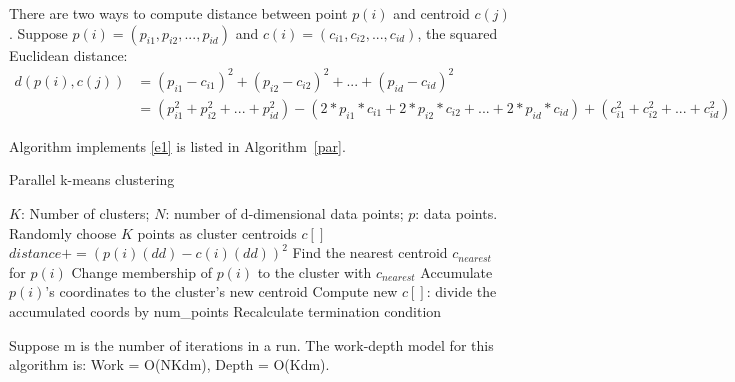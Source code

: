 \documentclass{article}
\begin{document}
There are two ways to compute distance between point $p(i)$
and centroid $c(j)$. Suppose $p(i) = (p_{i1}, p_{i2}, ..., p_{id})$ and $c(i) = (c_{i1},
c_{i2}, ..., c_{id})$, the squared Euclidean distance: 
\begin{align}
d(p(i),c(j)) &= (p_{i1} - c_{i1})^2 + (p_{i2} - c_{i2})^2 + ... + (p_{id} - c_{id})^2 \label{e1}\\
&= (p_{i1}^2 + p_{i2}^2 + ... + p_{id}^2) - (2*p_{i1}*c_{i1} + 2*p_{i2}*c_{i2} + ... + 2*p_{id}*c_{id})
+ (c_{i1}^2 + c_{i2}^2 + ... + c_{id}^2) \label{e2}
\end{align}

Algorithm implements \ref{e1} is listed in Algorithm~\ref{par}. 
\begin{algorithm}[!htp]
  \caption{Parallel k-means clustering} \label{par}
  \begin{algorithmic}[1]
    \INPUT $K$: Number of clusters; $N$: number of d-dimensional data points; $p$: data points.
     \label{alg:p}
    \State Randomly choose $K$ points as cluster centroids $c[]$
    \State $distance += (p(i)(dd) - c(i)(dd))^2$
    \EndFor
    \EndFor
    \State Find the nearest centroid $c_{nearest}$ for $p(i)$
    \State Change membership of $p(i)$ to the cluster with $c_{nearest}$
    \State Accumulate $p(i)$'s coordinates to the cluster's new centroid
    \EndParFor
    \State Compute new $c[]$: divide the accumulated coords by num\_points
    \State Recalculate termination condition
    \EndWhile
    \EndFunction  
  \end{algorithmic}
\end{algorithm}
Suppose m is the number of iterations in a run. The work-depth model for this algorithm is:
Work = O(NKdm), Depth = O(Kdm).
\end{document}
